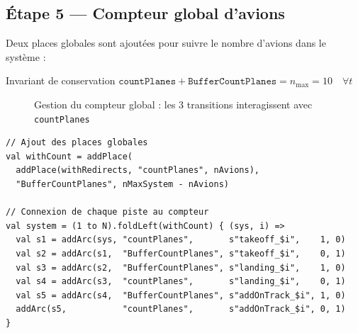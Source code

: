 \documentclass[a4paper,12pt]{article}
\begin{document}
\subsection{Étape 5 --- Compteur global d'avions}

Deux places globales sont ajoutées pour suivre le nombre d'avions dans le système :

\begin{defbox}{Invariant de conservation}
$\texttt{countPlanes} + \texttt{BufferCountPlanes} = n_{\max} = 10 \quad \forall t$
\end{defbox}

\begin{figure}[H]
\centering
{}
\caption{Gestion du compteur global : les 3 transitions interagissent avec \texttt{countPlanes}}
\end{figure}

\begin{lstlisting}
// Ajout des places globales
val withCount = addPlace(
  addPlace(withRedirects, "countPlanes", nAvions),
  "BufferCountPlanes", nMaxSystem - nAvions)

// Connexion de chaque piste au compteur
val system = (1 to N).foldLeft(withCount) { (sys, i) =>
  val s1 = addArc(sys, "countPlanes",       s"takeoff_$i",    1, 0)
  val s2 = addArc(s1,  "BufferCountPlanes", s"takeoff_$i",    0, 1)
  val s3 = addArc(s2,  "BufferCountPlanes", s"landing_$i",    1, 0)
  val s4 = addArc(s3,  "countPlanes",       s"landing_$i",    0, 1)
  val s5 = addArc(s4,  "BufferCountPlanes", s"addOnTrack_$i", 1, 0)
  addArc(s5,           "countPlanes",       s"addOnTrack_$i", 0, 1)
}
\end{lstlisting}
\end{document}
